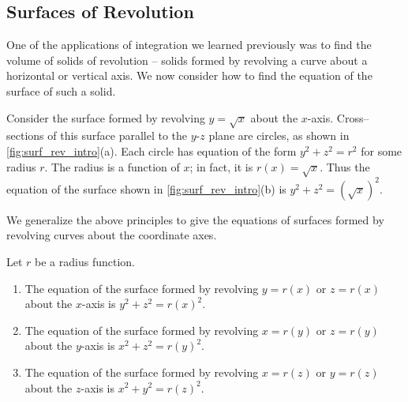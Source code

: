 \subsection*{Surfaces of Revolution}

One of the applications of integration we learned previously was to find the volume of solids of revolution -- solids formed by revolving a curve about a horizontal or vertical axis. We now consider how to find the equation of the surface of such a solid.

Consider the surface formed by revolving $y=\sqrt{x}$ about the $x$-axis. Cross--sections of this surface parallel to the $y$-$z$ plane are circles, as shown in \autoref{fig:surf_rev_intro}(a). Each circle has equation of the form $y^2+z^2=r^2$ for some radius $r$. The radius is a function of $x$; in fact, it is $r(x) = \sqrt{x}$. Thus the equation of the surface shown in \autoref{fig:surf_rev_intro}(b) is $y^2+z^2=(\sqrt{x})^2.$


We generalize the above principles to give the equations of surfaces formed by revolving curves about the coordinate axes.

{Let $r$ be a radius function. 
\begin{enumerate}
	\item The equation of the surface formed by revolving $y=r(x)$ or $z=r(x)$ about the $x$-axis is $y^2+z^2=r(x)^2$.
	\item The equation of the surface formed by revolving $x=r(y)$ or $z=r(y)$ about the $y$-axis is $x^2+z^2=r(y)^2$.
	\item The equation of the surface formed by revolving $x=r(z)$ or $y=r(z)$ about the $z$-axis is $x^2+y^2=r(z)^2$.
\end{enumerate}}

